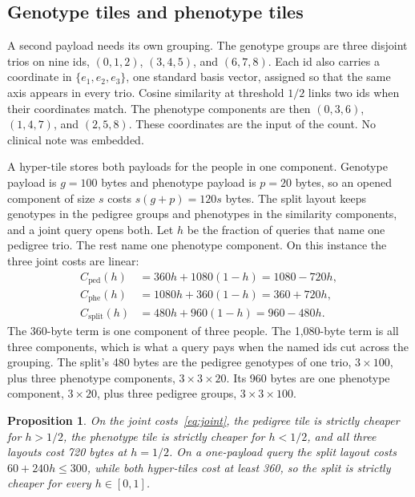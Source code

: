 \documentclass[11pt]{article}
\newtheorem{proposition}[theorem]{Proposition}
\begin{document}
\subsection{Genotype tiles and phenotype tiles}
\label{sec:hyper}

A second payload needs its own grouping.
The genotype groups are three disjoint trios on nine ids,
\((0,1,2)\), \((3,4,5)\), and \((6,7,8)\).
Each id also carries a coordinate in \(\{e_1, e_2, e_3\}\), one standard basis vector, assigned so that the same axis appears in every trio.
Cosine similarity at threshold \(1/2\) links two ids when their coordinates match.
The phenotype components are then \((0,3,6)\), \((1,4,7)\), and \((2,5,8)\).
These coordinates are the input of the count.
No clinical note was embedded.

A hyper-tile stores both payloads for the people in one component.
Genotype payload is \(g = 100\) bytes and phenotype payload is \(p = 20\) bytes, so an opened component of size \(s\) costs \(s(g+p) = 120s\) bytes.
The split layout keeps genotypes in the pedigree groups and phenotypes in the similarity components, and a joint query opens both.
Let \(h\) be the fraction of queries that name one pedigree trio.
The rest name one phenotype component.
On this instance the three joint costs are linear:
\begin{equation}
\begin{aligned}
C_{\mathrm{ped}}(h) &= 360h + 1080(1-h) = 1080 - 720h, \\
C_{\mathrm{phe}}(h) &= 1080h + 360(1-h) = 360 + 720h, \\
C_{\mathrm{split}}(h) &= 480h + 960(1-h) = 960 - 480h.
\end{aligned}
\label{eq:joint}
\end{equation}
The 360-byte term is one component of three people.
The 1{,}080-byte term is all three components, which is what a query pays when the named ids cut across the grouping.
The split's 480 bytes are the pedigree genotypes of one trio, \(3 \times 100\), plus three phenotype components, \(3 \times 3 \times 20\).
Its 960 bytes are one phenotype component, \(3 \times 20\), plus three pedigree groups, \(3 \times 3 \times 100\).

\begin{proposition}
\label{prop:tiles}
On the joint costs~\eqref{eq:joint}, the pedigree tile is strictly cheaper for \(h > 1/2\), the phenotype tile is strictly cheaper for \(h < 1/2\), and all three layouts cost 720 bytes at \(h = 1/2\).
On a one-payload query the split layout costs \(60 + 240h \le 300\), while both hyper-tiles cost at least 360, so the split is strictly cheaper for every \(h \in [0,1]\).
\end{proposition}
\end{document}
